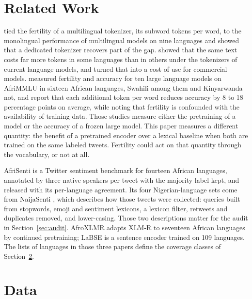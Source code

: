 \documentclass[11pt]{article}
\begin{document}
\section{Related Work}
\citet{rust2021tokenizer} tied the fertility of a multilingual tokenizer, its subword tokens per word, to the monolingual performance of multilingual models on nine languages and showed that a dedicated tokenizer recovers part of the gap. \citet{petrov2023unfairness} showed that the same text costs far more tokens in some languages than in others under the tokenizers of current language models, and \citet{ahia2023cost} turned that into a cost of use for commercial models. \citet{lundin2026tokentax} measured fertility and accuracy for ten large language models on AfriMMLU in sixteen African languages, Swahili among them and Kinyarwanda not, and report that each additional token per word reduces accuracy by 8 to 18 percentage points on average, while noting that fertility is confounded with the availability of training data. Those studies measure either the pretraining of a model or the accuracy of a frozen large model. This paper measures a different quantity: the benefit of a pretrained encoder over a lexical baseline when both are trained on the same labeled tweets. Fertility could act on that quantity through the vocabulary, or not at all.

AfriSenti \citep{muhammad2023afrisenti} is a Twitter sentiment benchmark for fourteen African languages, annotated by three native speakers per tweet with the majority label kept, and released with its per-language agreement. Its four Nigerian-language sets come from NaijaSenti \citep{muhammad2022naijasenti}, which describes how those tweets were collected: queries built from stopwords, emoji and sentiment lexicons, a lexicon filter, retweets and duplicates removed, and lower-casing. Those two descriptions matter for the audit in Section~\ref{sec:audit}. AfroXLMR \citep{alabi2022adapting} adapts XLM-R \citep{conneau2020xlmr} to seventeen African languages by continued pretraining; LaBSE \citep{feng2022labse} is a sentence encoder trained on 109 languages. The lists of languages in those three papers define the coverage classes of Section~\ref{sec:data}.

\section{Data}
\label{sec:data}
\end{document}
